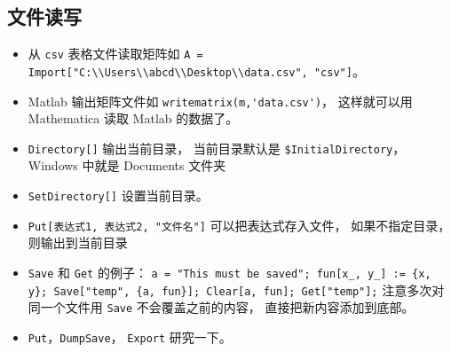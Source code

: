 \subsection{文件读写}
\begin{itemize}
\item 从 \verb|csv| 表格文件读取矩阵如 \verb|A = Import["C:\\Users\\abcd\\Desktop\\data.csv", "csv"]|。
\item Matlab 输出矩阵文件如 \verb|writematrix(m,'data.csv')|， 这样就可以用 Mathematica 读取 Matlab 的数据了。
\item \verb|Directory[]| 输出当前目录， 当前目录默认是 \verb|$InitialDirectory|， Windows 中就是 Documents 文件夹
\item \verb|SetDirectory[]| 设置当前目录。
\item \verb|Put[表达式1, 表达式2, "文件名"]| 可以把表达式存入文件， 如果不指定目录， 则输出到当前目录
\item \verb|Save| 和 \verb|Get| 的例子： \verb|a = "This must be saved"; fun[x_, y_] := {x, y}; Save["temp", {a, fun}]; Clear[a, fun]; Get["temp"];| 注意多次对同一个文件用 \verb|Save| 不会覆盖之前的内容， 直接把新内容添加到底部。
\item \verb|Put|，\verb|DumpSave|， \verb|Export| 研究一下。
\end{itemize}
